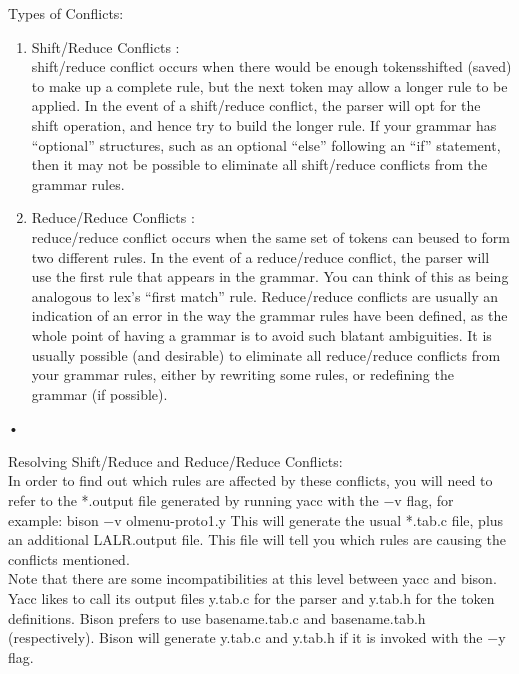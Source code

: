 \documentclass[11pt]{article}
\begin{document}
	\noindent
	Types of Conflicts:\\
	\begin{enumerate}
		\item Shift/Reduce Conflicts :\\
		shift/reduce conflict occurs when there would be enough tokensshifted (saved) to make up a complete rule, but the next token may allow a longer rule to be applied. In the event of a shift/reduce conflict, the parser will opt for the shift operation, and hence try to build the longer rule. If your grammar has “optional” structures, such as an optional “else” following an “if” statement, then it may not be possible to eliminate all shift/reduce conflicts from the grammar rules.\\
		\item Reduce/Reduce Conflicts :\\
		reduce/reduce conflict occurs when the same set of tokens can beused to form two different rules. In the event of a reduce/reduce conflict, the parser will use the first rule that appears in the grammar. You can think of this as being analogous to lex’s “first match” rule. Reduce/reduce conflicts are usually an indication of an error in the way the grammar rules have been defined, as the whole point of having a grammar is to avoid such blatant ambiguities. It is usually possible (and desirable) to eliminate all reduce/reduce conflicts from your grammar rules, either by rewriting some rules, or redefining the grammar (if possible).
		
	\end{enumerate}•
	
	\noindent
	Resolving Shift/Reduce and Reduce/Reduce Conflicts:\\
	
	In order to find out which rules are affected by these conflicts, you will need to refer to the *.output file generated by running yacc with the $-$v flag, for example: bison $-$v olmenu-proto1.y This will generate the usual *.tab.c file, plus an additional LALR.output file. This file will tell you which rules are causing the conflicts mentioned.\\
	Note that there are some incompatibilities at this level between yacc and bison. Yacc likes to call its output files y.tab.c for the parser and y.tab.h for the token definitions. Bison prefers to use basename.tab.c and basename.tab.h (respectively). Bison will generate y.tab.c and y.tab.h if it is invoked with the $-$y flag.\\
	
\end{document}
